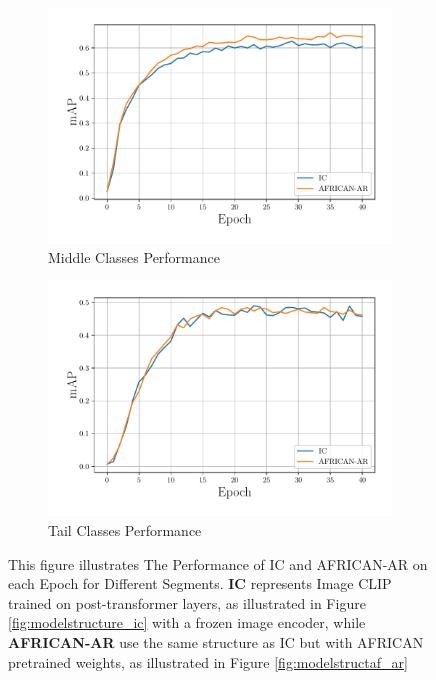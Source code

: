 \begin{figure}
\begin{adjustwidth}{-0.15\linewidth}{-0.07\linewidth}
    \vspace{10pt} %

    \begin{subfigure}[b]{0.65\textwidth}
        \includegraphics[width=\textwidth]{assets/charts/4_4_finalscore_2_middle}
        \caption{Middle Classes Performance}
        \label{fig:subfig3}
    \end{subfigure}
    \begin{subfigure}[b]{0.65\textwidth}
        \includegraphics[width=\textwidth]{assets/charts/4_4_finalscore_3_tail}
        \caption{Tail Classes Performance}
        \label{fig:subfig4}
    \end{subfigure}
    \caption[The Performance of IC and AFRICAN-AR on each Epoch for Different Segments]{This figure illustrates The Performance of IC and AFRICAN-AR on each Epoch for Different Segments. \textbf{IC} represents Image CLIP trained on post-transformer layers, as illustrated in Figure \ref{fig:modelstructure_ic} with a frozen image encoder, while \textbf{AFRICAN-AR} use the same structure as IC but with AFRICAN pretrained weights, as illustrated in Figure \ref{fig:modelstructaf_ar}}
    \label{fig:final_result}
    
\end{adjustwidth}
\end{figure}



